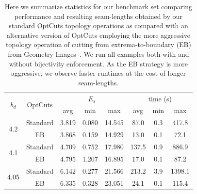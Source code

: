 \begin{table}[t]
\small
\centering
\caption{
Here we summarize statistics for our benchmark set comparing performance and resulting seam-lengths obtained by our standard OptCuts topology operations as compared with an alternative version of OptCuts employing the more aggressive topology operation of cutting from extrema-to-boundary (EB) from Geometry Images~\cite{Gu2002Geometry}. We run all examples both with and without bijectivity enforcement. As the EB strategy is more aggressive, we observe faster runtimes at the cost of longer seam-lengths.} 
\label{tb:comp_GI}
\vspace{-0.3cm}
\begin{tabular}{|c|c|ccc|ccc|}
\hline
\multirow{2}{*}{$b_d$} & \multirow{2}{*}{OptCuts} & \multicolumn{3}{c|}{$E_{s}$} & \multicolumn{3}{c|}{time (s)} \\ \cline{3-8} 
                       &                         & avg      & min     & max      & avg       & min    & max      \\ \hline
\multirow{2}{*}{4.2}   & Standard                    & 3.819   & 0.080  & 14.545  & 87.0   & 0.3 & 417.8 \\
                       & EB                & 3.868   & 0.159  & 14.929  & 13.0   & 0.1 & 72.1  \\ \hline
\multirow{2}{*}{4.1}   & Standard                    & 4.709   & 0.752  & 17.980  & 137.5  & 0.9 & 886.9 \\
                       & EB               & 4.795   & 1.207  & 16.895  & 17.0   & 0.1 & 87.2  \\ \hline
\multirow{2}{*}{4.05}  & Standard                    & 6.142   & 0.277  & 21.566  & 213.2  & 3.9 & 1398.1   \\
                       & EB                & 6.335   & 0.328  & 23.051  & 24.1   & 0.1 & 115.4 \\ \hline
\end{tabular}
\vspace{-0.3cm}
\end{table}

